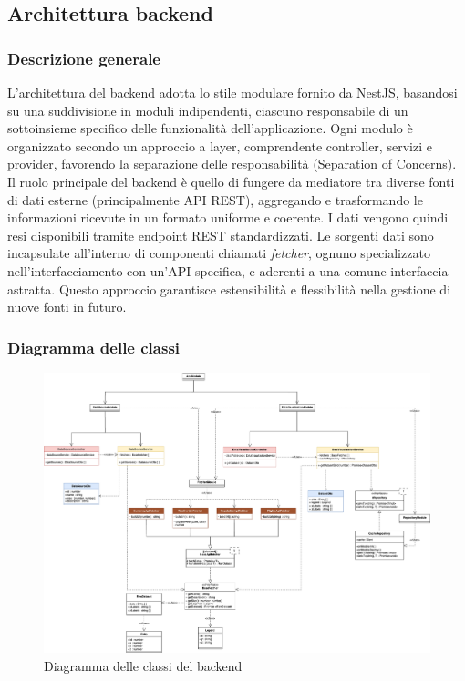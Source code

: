 \subsection{Architettura backend}

\subsubsection{Descrizione generale} 
L’architettura del backend adotta lo stile modulare fornito da NestJS, basandosi su una suddivisione in moduli indipendenti, ciascuno responsabile di un sottoinsieme specifico delle funzionalità dell’applicazione. Ogni modulo è organizzato secondo un approccio a layer, comprendente controller, servizi e provider, favorendo la separazione delle responsabilità (Separation of Concerns).\\
Il ruolo principale del backend è quello di fungere da mediatore tra diverse fonti di dati esterne (principalmente API REST), aggregando e trasformando le informazioni ricevute in un formato uniforme e coerente. I dati vengono quindi resi disponibili tramite endpoint REST standardizzati. Le sorgenti dati sono incapsulate all’interno di componenti chiamati \textit{fetcher}, ognuno specializzato nell’interfacciamento con un’API specifica, e aderenti a una comune interfaccia astratta. Questo approccio garantisce estensibilità e flessibilità nella gestione di nuove fonti in futuro.

\subsubsection{Diagramma delle classi}
\begin{figure}[H]
    \begin{center}
        \includegraphics[scale = 0.29]{template/images/uml_back/BackendUML.png}
        \caption{Diagramma delle classi del backend}
    \end{center}     
    
\end{figure}

